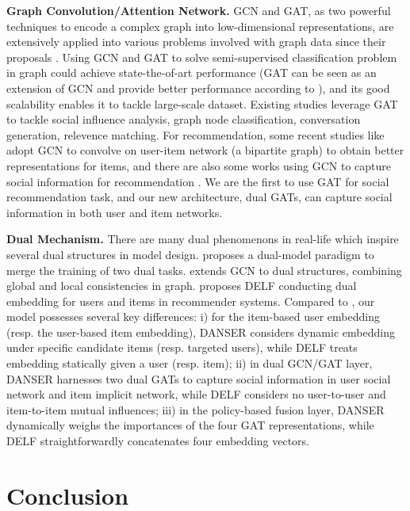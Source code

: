 \documentclass[sigconf]{acmart}
\begin{document}
\textbf{Graph Convolution/Attention Network.} GCN and GAT, as two powerful techniques to encode a complex graph into low-dimensional representations, are extensively applied into various problems involved with graph data since their proposals \cite{GCN1, GCN2, GAT}. Using GCN and GAT to solve semi-supervised classification problem in graph could achieve state-the-of-art performance (GAT can be seen as an extension of GCN and provide better performance according to \cite{GAT}), and its good scalability enables it to tackle large-scale dataset. Existing studies leverage GAT to tackle social influence analysis\cite{DeepInf}, graph node classification\cite{Adaptive}, conversation generation\cite{ConGen}, relevence matching\cite{DBLP:conf/cikm/ZhangLNLX18}. For recommendation, some recent studies like \cite{WebScale} adopt GCN to convolve on user-item network (a bipartite graph) to obtain better representations for items, and there are also some works using GCN to capture social information for recommendation \cite{GCNsocial1}\cite{GCNsocial2}. We are the first to use GAT for social recommendation task, and our new architecture, dual GATs, can capture social information in both user and item networks.

\textbf{Dual Mechanism.} There are many dual phenomenons in real-life which inspire several dual structures in model design. \cite{DualModel} proposes a dual-model paradigm to merge the training of two dual tasks. \cite{DGCN} extends GCN to dual structures, combining global and local consistencies in graph. \cite{DELF} proposes DELF conducting dual embedding for users and items in recommender systems. 
{Compared to} \cite{DELF}, our model possesses several key differences: i) for the item-based user embedding (resp. the user-based item embedding), DANSER considers dynamic embedding under specific candidate items (resp. targeted users), while DELF treats embedding statically given a user (resp. item); ii) in dual GCN/GAT layer, DANSER harnesses two dual GATs to capture social information in user social network and item implicit network, while DELF considers no user-to-user and item-to-item mutual influences; iii) in {the} policy-based fusion layer, DANSER dynamically weighs the importances of {the} four GAT representations, while DELF straightforward{ly} concatenate{s} four embedding vectors.

\section{Conclusion}
\end{document}
